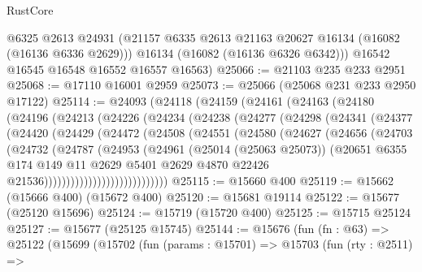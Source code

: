 \begin{lexlean}{RustCore}
\begin{coremodule}
        @6325
        @2613
        @24931
        (@21157 @6335 @2613 @21163 @20627 @16134 (@16082 (@16136 @6336 @2629)))
        @16134
        (@16082 (@16136 @6326 @6342)))
      @16542
      @16545
      @16548
      @16552
      @16557
      @16563)
@25066 := @21103 @235 @233 @2951
@25068 := @17110 @16001 @2959
@25073 := @25066 (@25068 @231 @233 @2950 @17122)
@25114 := @24093
    (@24118
      (@24159
        (@24161
          (@24163
            (@24180
              (@24196
                (@24213
                  (@24226
                    (@24234
                      (@24238
                        (@24277
                          (@24298
                            (@24341
                              (@24377
                                (@24420
                                  (@24429
                                    (@24472
                                      (@24508
                                        (@24551
                                          (@24580
                                            (@24627
                                              (@24656
                                                (@24703
                                                  (@24732
                                                    (@24787
                                                      (@24953
                                                        (@24961
                                                          (@25014 (@25063 @25073))
                                                          (@20651
                                                            @6355
                                                            @174
                                                            @149
                                                            @11
                                                            @2629
                                                            @5401
                                                            @2629
                                                            @4870
                                                            @22426
                                                            @21536))))))))))))))))))))))))))))
@25115 := @15660 @400
@25119 := @15662 (@15666 @400) (@15672 @400)
@25120 := @15681 @19114
@25122 := @15677 (@25120 @15696)
@25124 := @15719 (@15720 @400)
@25125 := @15715 @25124
@25127 := @15677 (@25125 @15745)
@25144 := @15676
    (fun (fn : @63) =>
    @25122
      (@15699
        (@15702
          (fun (params : @15701) =>
          @15703
            (fun (rty : @2511) =>

\end{coremodule}
\end{lexlean}
